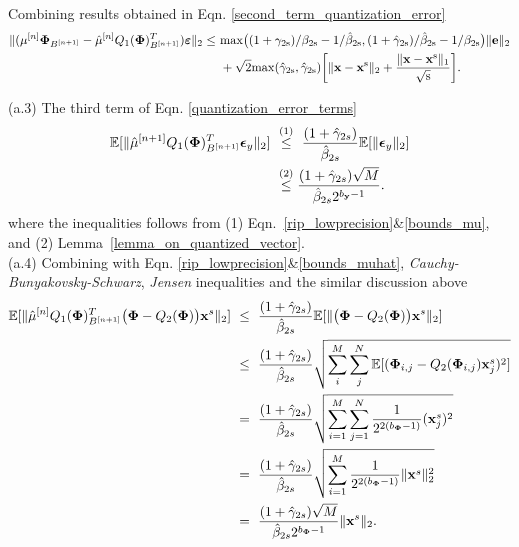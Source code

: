 \documentclass[article]{imsart}
\begin{document}
Combining results obtained in Eqn. \ref{second_term_quantization_error} 
\begin{equation}\label{second_term_main_theorem}
\begin{split}
    \|(\mu^{[n]}{\bf \Phi}_{B^{[n+1]}} - \hat{\mu}^{[n]}Q_1({\bf \Phi})_{B^{[n+1]}}^T)\boldsymbol{\bf \varepsilon} \|_2 \leq & \ \rm{max}\big((1+\gamma_{2s})/\beta_{2s} - 1/\hat{\beta}_{2s}, (1+\hat{\gamma}_{2s})/\hat{\beta}_{2s} - 1/{\beta}_{2s} \big)\|{\bf e} \|_2\\
    & \ + \sqrt{2}\rm{max}(\hat{\gamma}_{2s}, \hat{\gamma}_{2s})\bigg  [ \|{\bf x}-{\bf x}^s \|_2 + \frac{\|{\bf x}-{\bf x}^s \|_1}{\sqrt{s}}\bigg].
\end{split}
\end{equation}

(a.3) The third term of Eqn. \ref{quantization_error_terms}
\begin{equation}\label{third_term_main_theorem}
    \begin{split}
         \mathbb{E}[\|\hat{\mu}^{[n+1]}Q_1({\bf \Phi})_{B^{[n+1]}}^T \boldsymbol{\epsilon}_y \|_2]& \ \stackrel{(1)}{\leq} \  \frac{(1+\hat{\gamma}_{2s})}{\hat{\beta}_{2s}}\mathbb{E}[{\|\boldsymbol{\epsilon}_y \|_2}]\\
         &\ \stackrel{(2)}{\leq}\frac{(1+\hat{\gamma}_{2s})\sqrt{M}}{\hat{\beta}_{2s}2^{b_{\bf y}-1}}.
    \end{split}
\end{equation}
where the inequalities follows from (1) Eqn.~\ref{rip_lowprecision}\&\ref{bounds_mu}, and (2) Lemma~\ref{lemma_on_quantized_vector}.\\

(a.4) Combining with Eqn. \ref{rip_lowprecision}\&\ref{bounds_muhat}, {\it Cauchy-Bunyakovsky-Schwarz}, {\it Jensen} inequalities and the similar discussion above
\begin{equation}\label{forth_term_main_theorem}
\begin{split}
    \mathbb{E}[\| \hat{\mu}^{[n]}Q_1({\bf \Phi})_{B^{[n+1]}}^T\big({\bf {\bf \Phi}}-Q_2({\bf {\bf \Phi}})\big){\bf x}^s \|_2]&\ \leq \ \frac{(1+\hat{\gamma}_{2s})}{\hat{\beta}_{2s}}\mathbb{E}[\|\big({\bf {\bf \Phi}}-Q_2({\bf {\bf \Phi}})\big){\bf x}^s \|_2]\\
    &\ \leq \ \frac{(1+\hat{\gamma}_{2s})}{\hat{\beta}_{2s}}\sqrt{
    \sum_{i}^M \sum_{j}^N\mathbb{E}[({\bf \Phi}_{i, j}-Q_2({\bf \Phi}_{i, j}){\bf x}_j^s)^2]}\\
    & \ = \ \frac{(1+\hat{\gamma}_{2s})}{\hat{\beta}_{2s}}\sqrt{\sum_{i=1}^M \sum_{j=1}^N \frac{1}{2^{2(b_{\bf \Phi}-1)}}({\bf x}_j^s)^2}\\
    & \ = \ \frac{(1+\hat{\gamma}_{2s})}{\hat{\beta}_{2s}}\sqrt{\sum_{i=1}^M \frac{1}{2^{2(b_{\bf \Phi}-1)}}\|{\bf x}^s\|_2^2}\\
    & \ = \ \frac{(1+\hat{\gamma}_{2s})\sqrt{M}}{\hat{\beta}_{2s}2^{b_{\bf \Phi}-1}}\|{\bf x}^s \|_2.
\end{split}
\end{equation}
\end{document}
